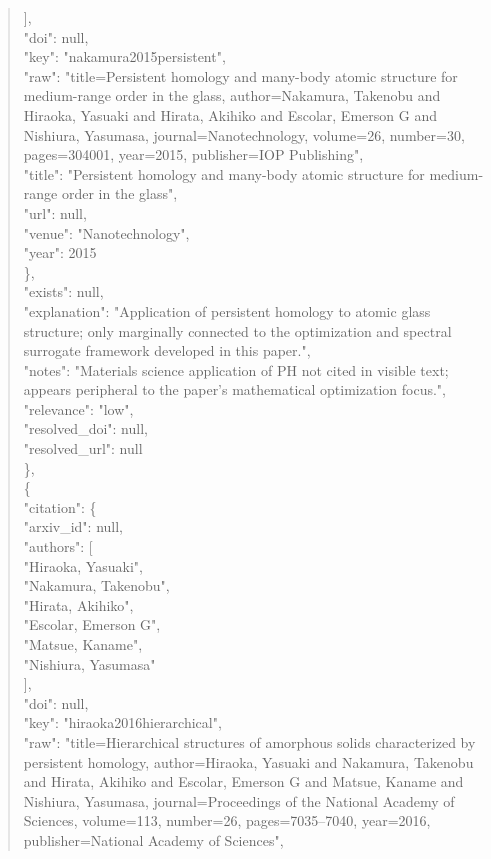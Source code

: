 \documentclass[11pt]{article}
\begin{document}
\begin{quote}
        ],\\
        "doi": null,\\
        "key": "nakamura2015persistent",\\
        "raw": "title=Persistent homology and many-body atomic structure for medium-range order in the glass, author=Nakamura, Takenobu and Hiraoka, Yasuaki and Hirata, Akihiko and Escolar, Emerson G and Nishiura, Yasumasa, journal=Nanotechnology, volume=26, number=30, pages=304001, year=2015, publisher=IOP Publishing",\\
        "title": "Persistent homology and many-body atomic structure for medium-range order in the glass",\\
        "url": null,\\
        "venue": "Nanotechnology",\\
        "year": 2015\\
      \},\\
      "exists": null,\\
      "explanation": "Application of persistent homology to atomic glass structure; only marginally connected to the optimization and spectral surrogate framework developed in this paper.",\\
      "notes": "Materials science application of PH not cited in visible text; appears peripheral to the paper's mathematical optimization focus.",\\
      "relevance": "low",\\
      "resolved\_doi": null,\\
      "resolved\_url": null\\
    \},\\
    \{\\
      "citation": \{\\
        "arxiv\_id": null,\\
        "authors": [\\
          "Hiraoka, Yasuaki",\\
          "Nakamura, Takenobu",\\
          "Hirata, Akihiko",\\
          "Escolar, Emerson G",\\
          "Matsue, Kaname",\\
          "Nishiura, Yasumasa"\\
        ],\\
        "doi": null,\\
        "key": "hiraoka2016hierarchical",\\
        "raw": "title=Hierarchical structures of amorphous solids characterized by persistent homology, author=Hiraoka, Yasuaki and Nakamura, Takenobu and Hirata, Akihiko and Escolar, Emerson G and Matsue, Kaname and Nishiura, Yasumasa, journal=Proceedings of the National Academy of Sciences, volume=113, number=26, pages=7035--7040, year=2016, publisher=National Academy of Sciences",\\

\end{quote}
\end{document}
